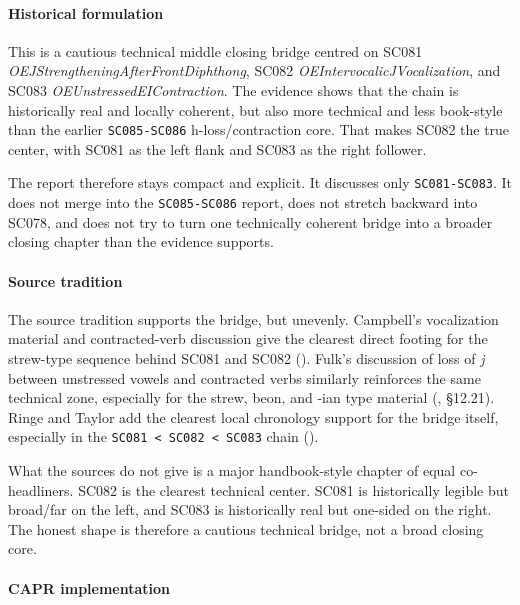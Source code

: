 \documentclass[
  british,
  a4paper,
]{article}
\begin{document}
\paragraph{Historical formulation}\label{historical-formulation-50}

This is a cautious technical middle closing bridge centred on SC081
\emph{OEJStrengtheningAfterFrontDiphthong}, SC082
\emph{OEIntervocalicJVocalization}, and SC083
\emph{OEUnstressedEIContraction}. The evidence shows that the chain is
historically real and locally coherent, but also more technical and less
book-style than the earlier \texttt{SC085-SC086} h-loss/contraction
core. That makes SC082 the true center, with SC081 as the left flank and
SC083 as the right follower.

The report therefore stays compact and explicit. It discusses only
\texttt{SC081-SC083}. It does not merge into the \texttt{SC085-SC086}
report, does not stretch backward into SC078, and does not try to turn
one technically coherent bridge into a broader closing chapter than the
evidence supports.

\paragraph{Source tradition}\label{source-tradition-50}

The source tradition supports the bridge, but unevenly. Campbell's
vocalization material and contracted-verb discussion give the clearest
direct footing for the strew-type sequence behind SC081 and SC082
().
Fulk's discussion of loss of \emph{j} between unstressed vowels and
contracted verbs similarly reinforces the same technical zone,
especially for the strew, beon, and -ian type material
(, §12.21). Ringe and
Taylor add the clearest local chronology support for the bridge itself,
especially in the \texttt{SC081\ \textless{}\ SC082\ \textless{}\ SC083}
chain ().

What the sources do not give is a major handbook-style chapter of equal
co-headliners. SC082 is the clearest technical center. SC081 is
historically legible but broad/far on the left, and SC083 is
historically real but one-sided on the right. The honest shape is
therefore a cautious technical bridge, not a broad closing core.

\paragraph{CAPR implementation}\label{capr-implementation-50}
\end{document}
